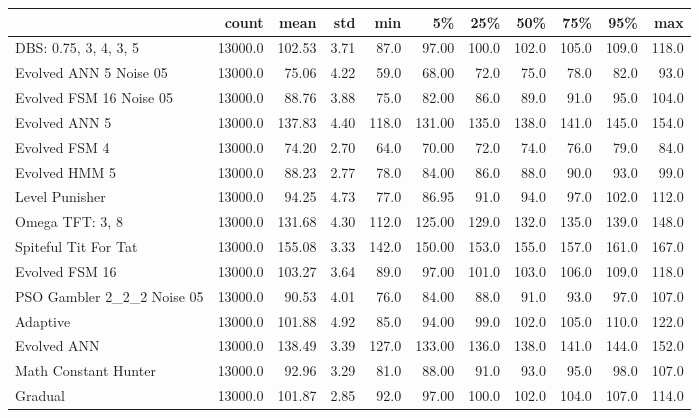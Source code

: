 \begin{tabular}{lrrrrrrrrrr}
\toprule
{} &    count &    mean &   std &    min &      5\% &    25\% &    50\% &    75\% &    95\% &    max \\
\midrule
DBS: 0.75, 3, 4, 3, 5      &  13000.0 &  102.53 &  3.71 &   87.0 &   97.00 &  100.0 &  102.0 &  105.0 &  109.0 &  118.0 \\
Evolved ANN 5 Noise 05     &  13000.0 &   75.06 &  4.22 &   59.0 &   68.00 &   72.0 &   75.0 &   78.0 &   82.0 &   93.0 \\
Evolved FSM 16 Noise 05    &  13000.0 &   88.76 &  3.88 &   75.0 &   82.00 &   86.0 &   89.0 &   91.0 &   95.0 &  104.0 \\
Evolved ANN 5              &  13000.0 &  137.83 &  4.40 &  118.0 &  131.00 &  135.0 &  138.0 &  141.0 &  145.0 &  154.0 \\
Evolved FSM 4              &  13000.0 &   74.20 &  2.70 &   64.0 &   70.00 &   72.0 &   74.0 &   76.0 &   79.0 &   84.0 \\
Evolved HMM 5              &  13000.0 &   88.23 &  2.77 &   78.0 &   84.00 &   86.0 &   88.0 &   90.0 &   93.0 &   99.0 \\
Level Punisher             &  13000.0 &   94.25 &  4.73 &   77.0 &   86.95 &   91.0 &   94.0 &   97.0 &  102.0 &  112.0 \\
Omega TFT: 3, 8            &  13000.0 &  131.68 &  4.30 &  112.0 &  125.00 &  129.0 &  132.0 &  135.0 &  139.0 &  148.0 \\
Spiteful Tit For Tat       &  13000.0 &  155.08 &  3.33 &  142.0 &  150.00 &  153.0 &  155.0 &  157.0 &  161.0 &  167.0 \\
Evolved FSM 16             &  13000.0 &  103.27 &  3.64 &   89.0 &   97.00 &  101.0 &  103.0 &  106.0 &  109.0 &  118.0 \\
PSO Gambler 2\_2\_2 Noise 05 &  13000.0 &   90.53 &  4.01 &   76.0 &   84.00 &   88.0 &   91.0 &   93.0 &   97.0 &  107.0 \\
Adaptive                   &  13000.0 &  101.88 &  4.92 &   85.0 &   94.00 &   99.0 &  102.0 &  105.0 &  110.0 &  122.0 \\
Evolved ANN                &  13000.0 &  138.49 &  3.39 &  127.0 &  133.00 &  136.0 &  138.0 &  141.0 &  144.0 &  152.0 \\
Math Constant Hunter       &  13000.0 &   92.96 &  3.29 &   81.0 &   88.00 &   91.0 &   93.0 &   95.0 &   98.0 &  107.0 \\
Gradual                    &  13000.0 &  101.87 &  2.85 &   92.0 &   97.00 &  100.0 &  102.0 &  104.0 &  107.0 &  114.0 \\
\bottomrule
\end{tabular}
